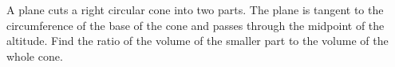 A plane cuts a right circular cone into two parts. The plane is tangent to the circumference of the base of the cone and passes through the midpoint of the altitude. Find the ratio of the volume of the smaller part to the volume of the whole cone.
